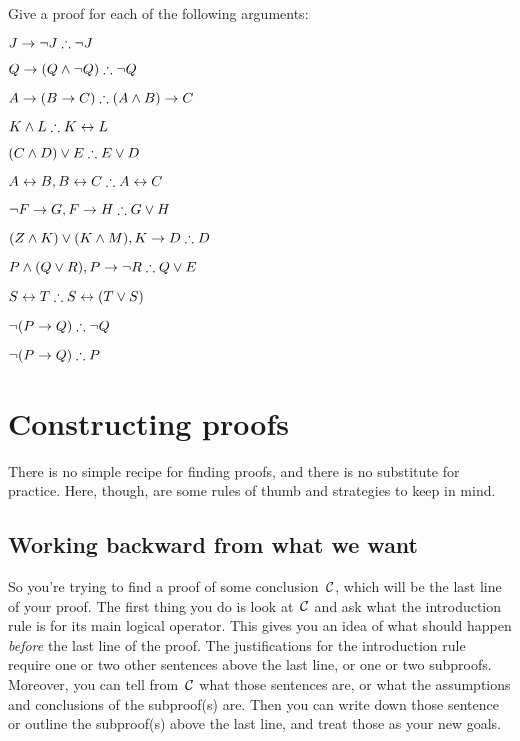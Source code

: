 \solutions
\problempart
\label{pr.solvedTFLproofs}
Give a proof for each of the following arguments:
\begin{earg}
\item $J\eif\enot J \therefore \enot J$
\item $Q\eif(Q\eand\enot Q) \therefore \enot Q$
\item $A\eif (B\eif C) \therefore (A\eand B)\eif C$
\item $K\eand L \therefore K\eiff L$
\item $(C\eand D)\eor E \therefore E\eor D$
\item $A\eiff B, B\eiff C \therefore A\eiff C$
\item $\enot F\eif G, F\eif H \therefore G\eor H$
\item $(Z\eand K) \eor (K\eand M), K \eif D \therefore D$
\item $P \eand (Q\eor R), P\eif \enot R \therefore Q\eor E$
\item $S\eiff T \therefore S\eiff (T\eor S)$
\item $\enot (P \eif Q) \therefore \enot Q$
\item $\enot (P \eif Q) \therefore P$
\end{earg}


\chapter{Constructing proofs}\label{s:stratTFL}

There is no simple recipe for finding proofs, and there is no substitute for practice. Here, though, are some rules of thumb and strategies to keep in mind.

\section{Working backward from what we want}

So you're trying to find a proof of some conclusion~$\mathcal{C}$, which will be the last line of your proof. The first thing you do is look at~$\mathcal{C}$ and ask what the introduction rule is for its main logical operator. This gives you an idea of what should happen \emph{before} the last line of the proof. The justifications for the introduction rule require one or two other sentences above the last line, or one or two subproofs. Moreover, you can tell from~$\mathcal{C}$ what those sentences are, or what the assumptions and conclusions of the subproof(s) are. Then you can write down those sentence or outline the subproof(s) above the last line, and treat those as your new goals.

